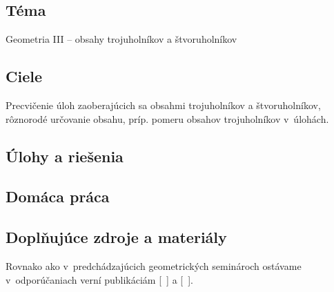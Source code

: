 

\subsection*{Téma}
Geometria III -- obsahy trojuholníkov a štvoruholníkov

\subsection*{Ciele}
Precvičenie úloh zaoberajúcich sa obsahmi trojuholníkov a štvoruholníkov,  rôznorodé určovanie obsahu, príp. pomeru obsahov trojuholníkov v~úlohách.

\subsection*{Úlohy a riešenia}













\subsection*{Domáca práca}




\subsection*{Doplňujúce zdroje a materiály}
Rovnako ako v~predchádzajúcich geometrických seminároch ostávame v~odporúčaniach verní publikáciám [~\cite{andreescu2013}] a [~\cite{kadlecek1996}].

